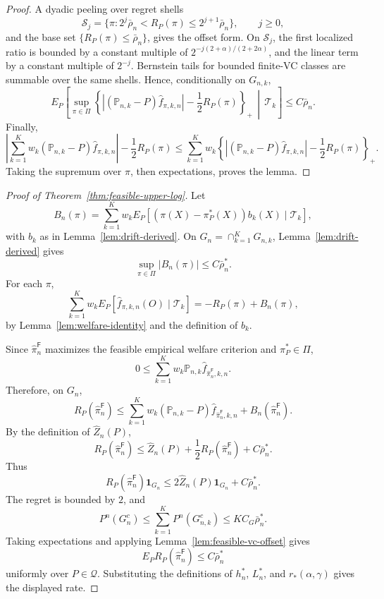 \documentclass[11pt]{article}
\newcommand{\one}{\mathbf{1}}
\theoremstyle{definition}
\theoremstyle{plain}
\theoremstyle{remark}
\begin{document}
\begin{proof}
A dyadic peeling over regret shells
\[
\mathcal S_j=\{\pi:2^j\bar\rho_n<R_P(\pi)\le2^{j+1}\bar\rho_n\},\qquad j\ge0,
\]
and the base set \(\{R_P(\pi)\le\bar\rho_n\}\), gives the offset form.  On
\(\mathcal S_j\), the first localized ratio is bounded by a constant multiple
of \(2^{-j(2+\alpha)/(2+2\alpha)}\), and the linear term by a constant
multiple of \(2^{-j}\).  Bernstein tails for bounded finite-VC classes are
summable over the same shells.  Hence, conditionally on \(G_{n,k}\),
\[
E_P\!\left[
\sup_{\pi\in\Pi}
\left\{|(\mathbb P_{n,k}-P)\widehat f_{\pi,k,n}|
-\frac12R_P(\pi)\right\}_+
\,\middle|\,\mathcal T_k\right]
\le C\bar\rho_n.
\]
Finally,
\[
\left|\sum_{k=1}^K w_k
(\mathbb P_{n,k}-P)\widehat f_{\pi,k,n}\right|
-\frac12R_P(\pi)
\le
\sum_{k=1}^K w_k
\left\{|(\mathbb P_{n,k}-P)\widehat f_{\pi,k,n}|
-\frac12R_P(\pi)\right\}_+.
\]
Taking the supremum over \(\pi\), then expectations, proves the lemma.
\end{proof}

\begin{proof}[Proof of Theorem~\ref{thm:feasible-upper-log}]
Let
\[
B_n(\pi)=
\sum_{k=1}^K w_k
E_P[(\pi(X)-\pi_P^*(X))b_k(X)\mid\mathcal T_k],
\]
with \(b_k\) as in Lemma~\ref{lem:drift-derived}.  On
\(G_n=\cap_{k=1}^K G_{n,k}\), Lemma~\ref{lem:drift-derived} gives
\[
\sup_{\pi\in\Pi}|B_n(\pi)|\le C\bar\rho_n^*.
\]
For each \(\pi\),
\[
\sum_{k=1}^K w_k
E_P[\widehat f_{\pi,k,n}(O)\mid\mathcal T_k]
=
-R_P(\pi)+B_n(\pi),
\]
by Lemma~\ref{lem:welfare-identity} and the definition of \(b_k\).

Since \(\widehat\pi_n^{\mathsf F}\) maximizes the feasible empirical welfare
criterion and \(\pi_P^*\in\Pi\),
\[
0\le
\sum_{k=1}^K w_k\mathbb P_{n,k}
\widehat f_{\widehat\pi_n^{\mathsf F},k,n}.
\]
Therefore, on \(G_n\),
\[
R_P(\widehat\pi_n^{\mathsf F})
\le
\sum_{k=1}^K w_k
(\mathbb P_{n,k}-P)\widehat f_{\widehat\pi_n^{\mathsf F},k,n}
+B_n(\widehat\pi_n^{\mathsf F}).
\]
By the definition of \(\widehat Z_n(P)\),
\[
R_P(\widehat\pi_n^{\mathsf F})
\le
\widehat Z_n(P)
+\frac12R_P(\widehat\pi_n^{\mathsf F})
+C\bar\rho_n^*.
\]
Thus
\[
R_P(\widehat\pi_n^{\mathsf F})\one_{G_n}
\le
2\widehat Z_n(P)\one_{G_n}+C\bar\rho_n^*.
\]
The regret is bounded by \(2\), and
\[
P^n(G_n^c)\le\sum_{k=1}^K P^n(G_{n,k}^c)
\le KC_G\bar\rho_n^*.
\]
Taking expectations and applying Lemma~\ref{lem:feasible-vc-offset} gives
\[
E_P R_P(\widehat\pi_n^{\mathsf F})
\le C\bar\rho_n^*
\]
uniformly over \(P\in\mathcal Q\).  Substituting the definitions of
\(h_n^*\), \(L_n^*\), and \(r_*(\alpha,\gamma)\) gives the displayed rate.
\end{proof}
\end{document}
